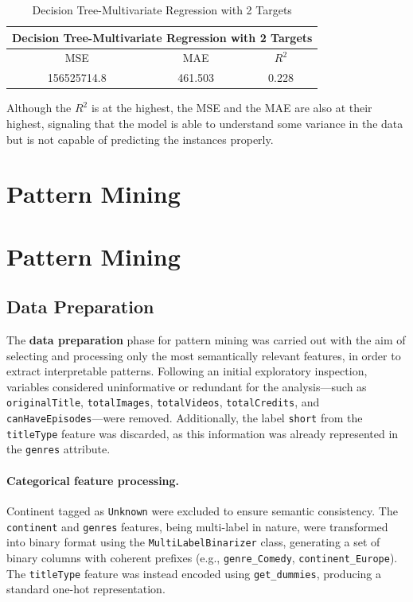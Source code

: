 \documentclass[10pt]{article}
\begin{document}
\begin{table}[h]
    \centering
    \begin{tabular}{|c|c|c|}
    \hline
    \multicolumn{3}{|c|}{Decision Tree-Multivariate Regression with 2 Targets} \\
    \hline
    MSE & MAE & $R^2$ \\
    \hline
    156525714.8 & 461.503 & 0.228 \\
    \hline
    \end{tabular}
    \caption{Decision Tree-Multivariate Regression with 2 Targets}
    \label{table:dt_2t}
\end{table}

Although the $R^2$ is at the highest, the MSE and the MAE are also at their highest, signaling that the model is able to understand some variance in the data but is not capable of predicting the instances properly.

\section{Pattern Mining}

\section{Pattern Mining}
\subsection{Data Preparation}

The \textbf{data preparation} phase for pattern mining was carried out with the aim of selecting and processing only the most semantically relevant features, in order to extract interpretable patterns.
Following an initial exploratory inspection, variables considered uninformative or redundant for the analysis—such as \texttt{originalTitle}, \texttt{totalImages}, \texttt{totalVideos}, \texttt{totalCredits}, and \texttt{canHaveEpisodes}—were removed. Additionally, the label  \texttt{short} from the \texttt{titleType} feature was discarded, as this information was already represented in the \texttt{genres} attribute.

\paragraph{Categorical feature processing.}
Continent tagged as \texttt{Unknown} were excluded to ensure semantic consistency.  
The \texttt{continent} and \texttt{genres} features, being multi-label in nature, were transformed into binary format using the \texttt{MultiLabelBinarizer} class, generating a set of binary columns with coherent prefixes (e.g., \texttt{genre\_Comedy}, \texttt{continent\_Europe}).  
The \texttt{titleType} feature was instead encoded using \texttt{get\_dummies}, producing a standard one-hot representation.
\end{document}
